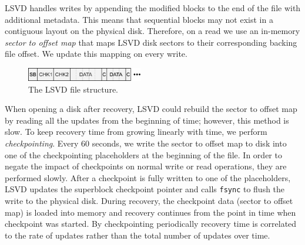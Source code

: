 LSVD handles writes by appending the modified blocks to the end of the file with additional metadata. This means that sequential blocks may not exist in a contiguous layout on the physical disk. Therefore, on a read we use an in-memory \emph{sector to offset map} that maps LSVD disk sectors to their corresponding backing file offset. We update this mapping on every write. 


\begin{figure}[h]
    \includegraphics[width=0.45\textwidth]{./figures/lsvd.pdf}
    \caption{The LSVD file structure.}
    \label{fig:lsvd}
\end{figure}

When opening a disk after recovery, LSVD could rebuild the sector to offset map by reading all the updates from the beginning of time; however, this method is slow. To keep recovery time from growing linearly with time, we perform \emph{checkpointing}. Every 60 seconds, we write the sector to offset map to disk into one of the checkpointing placeholders at the beginning of the file. In order to negate the impact of checkpoints on normal write or read operations, they are performed slowly. After a checkpoint is fully written to one of the placeholders, LSVD updates the superblock checkpoint pointer and calls \texttt{fsync} to flush the write to the physical disk. During recovery, the checkpoint data (sector to offset map) is loaded into memory and recovery continues from the point in time when checkpoint was started. By checkpointing periodically recovery time is correlated to the rate of updates rather than the total number of updates over time.


